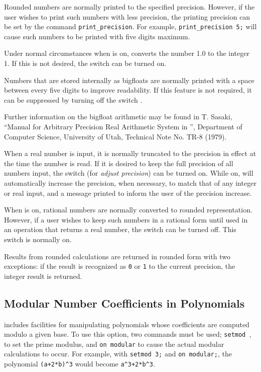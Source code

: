 \hypertarget{command:PRINT_PRECISION}{}
Rounded numbers are normally printed to the specified precision.  However,
if the user wishes to print such numbers with less precision, the printing
precision can be set by the command \texttt{print\_precision}.
 For example, \texttt{print\_precision 5;} will
cause such numbers to be printed with five digits maximum.

\hypertarget{switch:NOCONVERT}{}
Under normal circumstances when  is on, {\REDUCE} converts the
number 1.0 to the integer 1.  If this is not desired, the switch
 can be turned on.

\hypertarget{switch:BFSPACE}{}
Numbers that are stored internally as bigfloats are normally printed with
a space between every five digits to improve readability.  If this
feature is not required, it can be suppressed by turning off the switch
.

Further information on the bigfloat arithmetic may be found in T. Sasaki,
``Manual for Arbitrary Precision Real Arithmetic System in {\REDUCE}'',
Department of Computer Science, University of Utah, Technical Note No.
TR-8 (1979).

\hypertarget{switch:ADJPREC}{}
When a real number is input, it is normally truncated to the precision in
effect at the time the number is read.  If it is desired to keep the full
precision of all numbers input, the switch 
(for \emph{adjust precision}) can be turned on.  While on, 
will automatically increase the precision, when necessary, to match that
of any integer or real input, and a message printed to inform the user of
the precision increase.

\hypertarget{switch:ROUNDALL}{}
When  is on, rational numbers are normally converted to
rounded representation.  However, if a user wishes to keep such numbers in
a rational form until used in an operation that returns a real number,
the switch  can be turned off.  This
switch is normally on.

Results from rounded calculations are returned in rounded form with two
exceptions: if the result is recognized as \texttt{0} or \texttt{1} to the
current precision, the integer result is returned.

\subsection{Modular Number Coefficients in Polynomials}
\label{sec:polyrat-modular}
\hypertarget{switch:MODULAR}{}
\hypertarget{command:SETMOD}{}
{\REDUCE} includes facilities for manipulating polynomials whose
coefficients are computed modulo a given base.  To use this option, two
commands must be used; \texttt{setmod }, to set
the prime modulus, and \texttt{on modular} to cause the
actual modular calculations to occur.
For example, with \texttt{setmod 3;} and \texttt{on modular;}, the polynomial
\texttt{(a+2*b)\textasciicircum3} would become
\texttt{a\textasciicircum3+2*b\textasciicircum3}.

